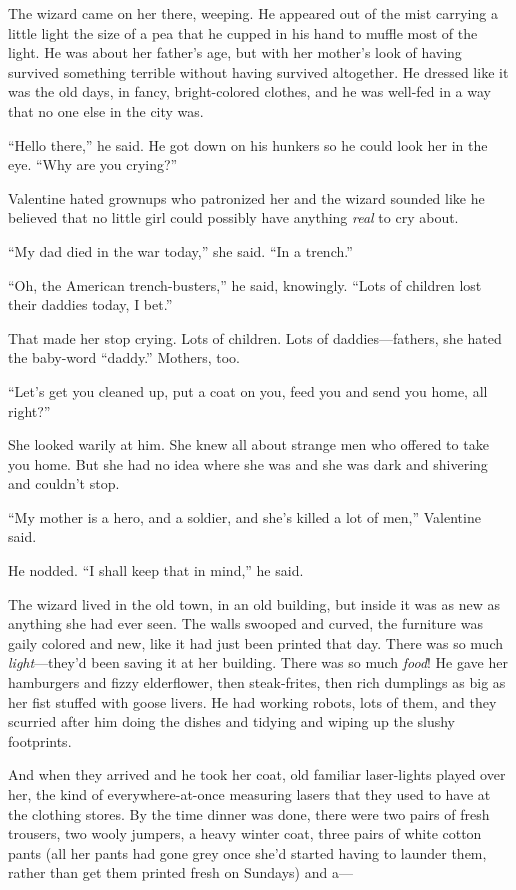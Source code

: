 The wizard came on her there, weeping. He appeared out of the mist
carrying a little light the size of a pea that he cupped in his
hand to muffle most of the light. He was about her father’s age,
but with her mother’s look of having survived something terrible
without having survived altogether. He dressed like it was the old
days, in fancy, bright-colored clothes, and he was well-fed in a
way that no one else in the city was.

“Hello there,” he said. He got down on his hunkers so he could look
her in the eye. “Why are you crying?”

Valentine hated grownups who patronized her and the wizard sounded
like he believed that no little girl could possibly have anything
\emph{real} to cry about.

“My dad died in the war today,” she said. “In a trench.”

“Oh, the American trench-busters,” he said, knowingly. “Lots of
children lost their daddies today, I bet.”

That made her stop crying. Lots of children. Lots of
daddies—fathers, she hated the baby-word “daddy.” Mothers, too.

“Let’s get you cleaned up, put a coat on you, feed you and send you
home, all right?”

She looked warily at him. She knew all about strange men who
offered to take you home. But she had no idea where she was and she
was dark and shivering and couldn’t stop.

“My mother is a hero, and a soldier, and she’s killed a lot of
men,” Valentine said.

He nodded. “I shall keep that in mind,” he said.

The wizard lived in the old town, in an old building, but inside it
was as new as anything she had ever seen. The walls swooped and
curved, the furniture was gaily colored and new, like it had just
been printed that day. There was so much \emph{light}—they’d been
saving it at her building. There was so much \emph{food}! He gave
her hamburgers and fizzy elderflower, then steak-frites, then rich
dumplings as big as her fist stuffed with goose livers. He had
working robots, lots of them, and they scurried after him doing the
dishes and tidying and wiping up the slushy footprints.

And when they arrived and he took her coat, old familiar
laser-lights played over her, the kind of everywhere-at-once
measuring lasers that they used to have at the clothing stores. By
the time dinner was done, there were two pairs of fresh trousers,
two wooly jumpers, a heavy winter coat, three pairs of white cotton
pants (all her pants had gone grey once she’d started having to
launder them, rather than get them printed fresh on Sundays) and
a—

